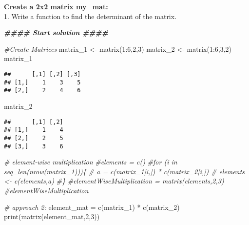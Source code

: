 \documentclass[
]{article}
\newenvironment{Shaded}{\begin{snugshade}}{\end{snugshade}}
\newcommand{\CommentTok}[1]{\textcolor[rgb]{0.56,0.35,0.01}{\textit{#1}}}
\newcommand{\DecValTok}[1]{\textcolor[rgb]{0.00,0.00,0.81}{#1}}
\newcommand{\DocumentationTok}[1]{\textcolor[rgb]{0.56,0.35,0.01}{\textbf{\textit{#1}}}}
\newcommand{\FunctionTok}[1]{\textcolor[rgb]{0.00,0.00,0.00}{#1}}
\newcommand{\NormalTok}[1]{#1}
\newcommand{\OtherTok}[1]{\textcolor[rgb]{0.56,0.35,0.01}{#1}}
\newcommand{\SpecialCharTok}[1]{\textcolor[rgb]{0.00,0.00,0.00}{#1}}
\begin{document}
\textbf{Create a 2x2 matrix my\_mat:}\\
1. Write a function to find the determinant of the matrix.

\begin{Shaded}
\begin{Highlighting}[]
\DocumentationTok{\#\#\#\# Start solution \#\#\#\#}
\end{Highlighting}
\end{Shaded}

\begin{Shaded}
\begin{Highlighting}[]
\CommentTok{\#Create Matrices}
\NormalTok{matrix\_1 }\OtherTok{\textless{}{-}} \FunctionTok{matrix}\NormalTok{(}\DecValTok{1}\SpecialCharTok{:}\DecValTok{6}\NormalTok{,}\DecValTok{2}\NormalTok{,}\DecValTok{3}\NormalTok{)}
\NormalTok{matrix\_2 }\OtherTok{\textless{}{-}} \FunctionTok{matrix}\NormalTok{(}\DecValTok{1}\SpecialCharTok{:}\DecValTok{6}\NormalTok{,}\DecValTok{3}\NormalTok{,}\DecValTok{2}\NormalTok{)}
\NormalTok{matrix\_1}
\end{Highlighting}
\end{Shaded}

\begin{verbatim}
##      [,1] [,2] [,3]
## [1,]    1    3    5
## [2,]    2    4    6
\end{verbatim}

\begin{Shaded}
\begin{Highlighting}[]
\NormalTok{matrix\_2}
\end{Highlighting}
\end{Shaded}

\begin{verbatim}
##      [,1] [,2]
## [1,]    1    4
## [2,]    2    5
## [3,]    3    6
\end{verbatim}

\begin{Shaded}
\begin{Highlighting}[]
\CommentTok{\# element{-}wise multiplication}
\CommentTok{\#elements = c()}
\CommentTok{\#for (i in seq\_len(nrow(matrix\_1)))\{}
\CommentTok{\#     a = c(matrix\_1[i,]) * c(matrix\_2[i,])}
\CommentTok{\#     elements \textless{}{-} c(elements,a)}
\CommentTok{\#\}}
\CommentTok{\#elementWiseMultiplication = matrix(elements,2,3)}
\CommentTok{\#elementWiseMultiplication}

\CommentTok{\# approach 2:}
\NormalTok{element\_mat }\OtherTok{=} \FunctionTok{c}\NormalTok{(matrix\_1) }\SpecialCharTok{*} \FunctionTok{c}\NormalTok{(matrix\_2)}
\FunctionTok{print}\NormalTok{(}\FunctionTok{matrix}\NormalTok{(element\_mat,}\DecValTok{2}\NormalTok{,}\DecValTok{3}\NormalTok{))}
\end{Highlighting}
\end{Shaded}
\end{document}
